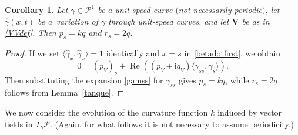 \documentclass[pdftex]{sigma}
\newcommand\Leg{ {\mathcal P}} %
\newcommand\kk{k} %
\def\ri{\mathrm{i}}
\newcommand\VV{\mathbf V}
\def\gam{\gamma} %
\newcommand\gamf{\widehat{\gam}} %
\renewcommand\Re{\operatorname{Re}}
\numberwithin{equation}{section}
\newtheorem{Corollary}[Theorem]{Corollary}
\begin{document}
\begin{Corollary}\label{nonstretch} Let $\gam \in \Leg^1$ be a unit-speed curve $($not necessarily periodic$)$, let $\gamf(x,t)$ be a~variation of $\gam$ through unit-speed curves, and let $\VV$ be as in \eqref{VVdef}. Then $p_s = \kk q$ and $r_s=2q$.
\end{Corollary}
\begin{proof} If we set $\bigl\langle \gamf_x, \gamf_x\bigr\rangle=1$ identically and $x=s$ in \eqref{betadotfirst}, we obtain
\[0 = (p_V)_s+ \Re( (p_V +\ri q_V) \langle \gam_{ss}, \gam_s\rangle ).\]
Then substituting the expansion \eqref{gamss} for $\gam_{ss}$ gives $p_s = \kk q$, while $r_s=2q$ follows from Lemma~\ref{tanque}.
\end{proof}

We now consider the evolution of the curvature function $\kk$ induced
by vector fields in $T_\gamma \Leg$. (Again, for what follows it is not necessary to assume periodicity.)
\end{document}
